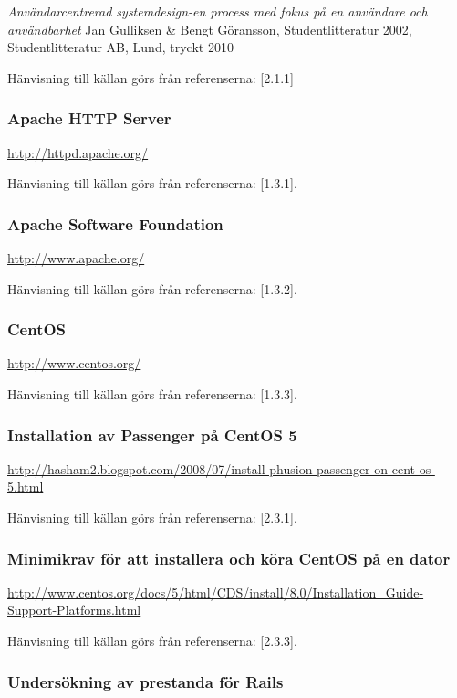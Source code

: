 \documentclass[a4paper, twoside, 11pt, titlepage]{article}
\begin{document}
		\emph{Användarcentrerad systemdesign-en process med fokus på en användare och användbarhet} Jan Gulliksen \& Bengt Göransson, Studentlitteratur 2002, Studentlitteratur AB, Lund, tryckt 2010

		Hänvisning till källan görs från referenserna: [2.1.1]

		\subsubsection{Apache HTTP Server}


		\url{http://httpd.apache.org/}

		Hänvisning till källan görs från referenserna: [1.3.1].

		\subsubsection{Apache Software Foundation}


		\url{http://www.apache.org/}

		Hänvisning till källan görs från referenserna: [1.3.2].

		\subsubsection{CentOS}


		\url{http://www.centos.org/}

		Hänvisning till källan görs från referenserna: [1.3.3].

		\subsubsection{Installation av Passenger på CentOS 5}


		\url{http://hasham2.blogspot.com/2008/07/install-phusion-passenger-on-cent-os-5.html}

		Hänvisning till källan görs från referenserna: [2.3.1].

		\subsubsection{Minimikrav för att installera och köra CentOS på en dator}


		\url{http://www.centos.org/docs/5/html/CDS/install/8.0/Installation_Guide-Support-Platforms.html}

		Hänvisning till källan görs från referenserna: [2.3.3].

		\subsubsection{Undersökning av prestanda för Rails}
\end{document}
